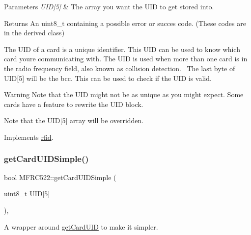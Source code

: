 \begin{DoxyParams}{Parameters}
{\em U\+I\+D\mbox{[}5\mbox{]}} & The array you want the U\+ID to get stored into. \\
\hline
\end{DoxyParams}
\begin{DoxyReturn}{Returns}
An uint8\+\_\+t containing a possible error or succes code. (These codes are in the derived class)
\end{DoxyReturn}
The U\+ID of a card is a unique identifier. This U\+ID can be used to know which card you\textquotesingle{}re communicating with. The U\+ID is used when more than one card is in the radio frequency field, also known as collision detection.~\newline
 The last byte of U\+ID\mbox{[}5\mbox{]} will be the bcc. This can be used to check if the U\+ID is valid. \begin{DoxyWarning}{Warning}
Note that the U\+ID might not be as unique as you might expect. Some cards have a feature to rewrite the U\+ID block. 

Note that the U\+ID\mbox{[}5\mbox{]} array will be overridden. 
\end{DoxyWarning}


Implements \mbox{\hyperlink{classrfid_afeb2a321694ceaf84db793f5efb3a750}{rfid}}.

\mbox{\label{class_m_f_r_c522_a33c20be6030f635d986984db4999a1eb}} 
\subsubsection{\texorpdfstring{get\+Card\+U\+I\+D\+Simple()}{getCardUIDSimple()}}
{\footnotesize\ttfamily bool M\+F\+R\+C522\+::get\+Card\+U\+I\+D\+Simple (\begin{DoxyParamCaption}\item[{uint8\+\_\+t}]{U\+ID\mbox{[}5\mbox{]} }\end{DoxyParamCaption})\hspace{0.3cm}{\ttfamily [override]}, {\ttfamily [virtual]}}



A wrapper around \mbox{\hyperlink{class_m_f_r_c522_ad3c7ab4c70988e80c400f36f724a12b7}{get\+Card\+U\+ID}} to make it simpler. 


